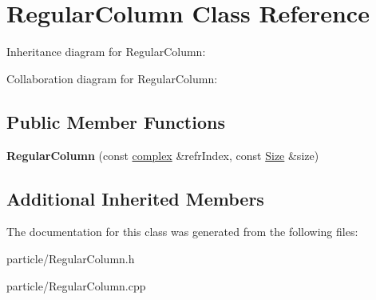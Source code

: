 \hypertarget{class_regular_column}{}\section{Regular\+Column Class Reference}
\label{class_regular_column}


Inheritance diagram for Regular\+Column\+:


Collaboration diagram for Regular\+Column\+:
\subsection*{Public Member Functions}
\begin{DoxyCompactItemize}
\item 
\mbox{\label{class_regular_column_a812a5c38e59e8c467db27253cc993eff}} 
{\bfseries Regular\+Column} (const \mbox{\hyperlink{classcomplex}{complex}} \&refr\+Index, const \mbox{\hyperlink{struct_size}{Size}} \&size)
\end{DoxyCompactItemize}
\subsection*{Additional Inherited Members}


The documentation for this class was generated from the following files\+:\begin{DoxyCompactItemize}
\item 
particle/Regular\+Column.\+h\item 
particle/Regular\+Column.\+cpp\end{DoxyCompactItemize}
